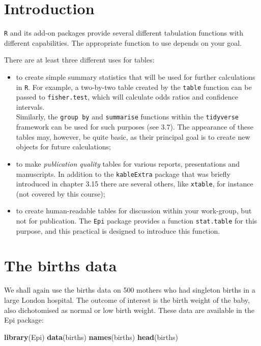 \documentclass[
]{book}
\newenvironment{Shaded}{\begin{snugshade}}{\end{snugshade}}
\newcommand{\FunctionTok}[1]{\textcolor[rgb]{0.13,0.29,0.53}{\textbf{#1}}}
\newcommand{\NormalTok}[1]{#1}
\begin{document}
\section{Introduction}\label{introduction-2}

\texttt{R} and its add-on packages provide several different
tabulation functions with different capabilities. The appropriate function
to use depends on your goal.

There are at least three different uses for tables:

\begin{itemize}
\item
  to create simple summary statistics that will be used for further calculations in \texttt{R}. For example, a two-by-two table created by the \texttt{table} function can be passed to \texttt{fisher.test}, which will calculate odds ratios and confidence intervals.\\
  Similarly, the \texttt{group\ by} and \texttt{summarise} functions within the \texttt{tidyverse} framework can be used for such purposes (see 3.7).
  The appearance of these tables may, however, be quite basic,
  as their principal goal is to create new objects for future calculations;
\item
  to make \emph{publication quality} tables for various reports, presentations and manuscripts. In addition to the \texttt{kableExtra}
  package that was briefly introduced in chapter 3.15 there are several others, like \texttt{xtable}, for instance (not covered by this course);
\item
  to create human-readable tables for discussion within your work-group, but not for publication. The
  \texttt{Epi} package provides a function \texttt{stat.table} for this purpose,
  and this practical is designed to introduce this function.
\end{itemize}

\section{The births data}\label{the-births-data-1}

We shall again use the births data on 500 mothers who had
singleton births in a large London hospital. The outcome of interest
is the birth weight of the baby, also dichotomised as normal or low
birth weight. These data are available in the Epi package:

\begin{Shaded}
\begin{Highlighting}[]
\FunctionTok{library}\NormalTok{(Epi)}
\FunctionTok{data}\NormalTok{(births)}
\FunctionTok{names}\NormalTok{(births)}
\FunctionTok{head}\NormalTok{(births)}
\end{Highlighting}
\end{Shaded}
\end{document}
